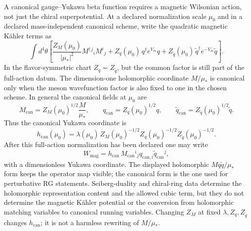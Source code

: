 A canonical gauge--Yukawa beta function requires a magnetic Wilsonian action,
not just the chiral superpotential.  At a declared normalization scale \(\mu_0\)
and in a declared mass-independent canonical scheme, write the quadratic
magnetic Kähler terms as
\begin{equation}
  \int d^4\theta\left[
    \frac{Z_M(\mu_0)}{|\mu_*|^2}
    M^\dagger{}^j{}_i M^i{}_j
    +
    Z_q(\mu_0)\,q^\dagger e^{V_m}q
    +
    Z_{\widetilde q}(\mu_0)\,
    \widetilde q^\dagger e^{-V_m}\widetilde q
  \right].
  \label{eq:sqcd-magnetic-kahler-normalization}
\end{equation}
In the flavor-symmetric chart \(Z_q=Z_{\widetilde q}\), but the common factor is
still part of the full-action datum.  The dimension-one holomorphic coordinate
\(M/\mu_*\) is canonical only when the meson wavefunction factor is also fixed
to one in the chosen scheme.  In general the canonical fields at \(\mu_0\) are
\begin{equation}
  M_{\mathrm{can}}=Z_M(\mu_0)^{1/2}\frac{M}{\mu_*},\qquad
  q_{\mathrm{can}}=Z_q(\mu_0)^{1/2}q,\qquad
  \widetilde q_{\mathrm{can}}
  =Z_{\widetilde q}(\mu_0)^{1/2}\widetilde q .
  \label{eq:sqcd-magnetic-canonical-fields}
\end{equation}
Thus the canonical Yukawa coordinate is
\begin{equation}
  h_{\mathrm{can}}(\mu_0)
  =
  \lambda(\mu_0)\,
  Z_M(\mu_0)^{-1/2}
  Z_q(\mu_0)^{-1/2}
  Z_{\widetilde q}(\mu_0)^{-1/2}.
  \label{eq:sqcd-magnetic-canonical-yukawa-coupling}
\end{equation}
After this full-action normalization has been declared one may write
\begin{equation}
  W_{\mathrm{mag}}
  =
  h_{\mathrm{can}}\,
  M_{\mathrm{can}}{}^i{}_j
  q_{\mathrm{can},i}\widetilde q_{\mathrm{can}}{}^j ,
  \label{eq:sqcd-magnetic-canonical-yukawa}
\end{equation}
with a dimensionless Yukawa coordinate.  The displayed holomorphic
\(M q\widetilde q/\mu_*\) form keeps the operator map visible; the canonical
form is the one used for perturbative RG statements.  Seiberg-duality and
chiral-ring data determine the holomorphic representation content and the
allowed cubic term, but they do not determine the magnetic Kähler potential or
the conversion from holomorphic matching variables to canonical running
variables.  Changing \(Z_M\) at fixed \(\lambda,Z_q,Z_{\widetilde q}\) changes
\(h_{\mathrm{can}}\); it is not a harmless rewriting of \(M/\mu_*\).

